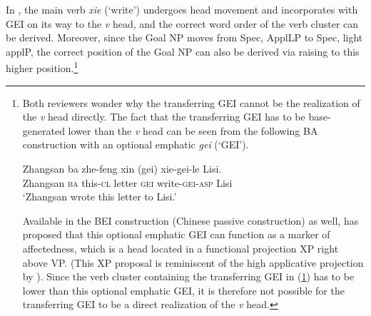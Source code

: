 \documentclass[output=paper,colorlinks,citecolor=brown]{langscibook}
\begin{document}
In , the main verb \textit{xie} (`write') undergoes head movement and incorporates with GEI on its way to the \textit{v} head, and the correct word order of the verb cluster can be derived. Moreover, since the Goal NP moves from Spec, ApplLP to Spec, light applP, the correct position of the Goal NP can also be derived via raising to this higher position.\footnote{Both reviewers wonder why the transferring GEI cannot be the realization of the \textit{v} head directly. The fact that the transferring GEI has to be base-generated lower than the \textit{v} head can be seen from the following BA construction with an optional emphatic \textit{gei} (`GEI').

\ea
\label{kuoii}
\gll Zhangsan ba zhe-feng	xin (gei)	xie-gei-le 		Lisi.\\
Zhangsan \textsc{ba} this-\textsc{cl} letter	\textsc{gei}	write-\textsc{gei}-\textsc{asp}	Lisi
\\
\glt `Zhangsan wrote this letter to Lisi.'
\z

Available in the BEI construction (Chinese passive construction) as well, \cite{Tang2001} has proposed that this optional emphatic GEI can function as a marker of affectedness, which is a head located in a functional projection XP right above VP. (This XP proposal is reminiscent of the high applicative projection by \citet{Pylkkanen2002, Pylkkanen2008}). Since the verb cluster containing the transferring GEI in (\ref{kuoii}) has to be lower than this optional emphatic GEI, it is therefore not possible for the transferring GEI to be a direct realization of the \textit{v} head.}


\end{document}
